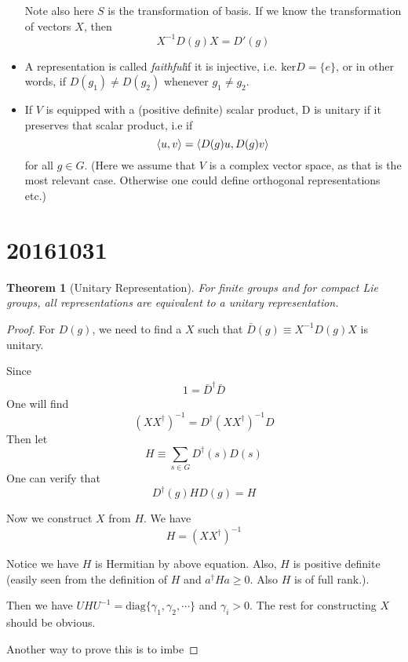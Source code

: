 \documentclass{article}
\numberwithin{equation}{subsection} %
\newtheorem{thm}{Theorem}[section]
\theoremstyle{definition}
\begin{document}
\begin{itemize}
        Note also here $S$ is the transformation of basis. If we know
        the transformation of vectors $X$, then
        \begin{equation}
            X^{-1} D(g)X = D'(g)
        \end{equation}
    \item A representation is called
        \textit{faithful}if it is injective, i.e.
        $\mathrm{ker} D = \{e\}$, or in other words, if $D(g_1) \neq
        D(g_2)$ whenever $g_1 \neq g_2$.
    \item If $V$ is equipped with a (positive definite) scalar
        product, D is unitary if it preserves that scalar product, i.e
        if
        \begin{equation}
            \braket{u,v} = \braket{D(g)u,D(g)v}
        \end{equation}
        for all $g\in G$. (Here we assume that $V$ is a complex vector
        space, as that is the most relevant case. Otherwise one could
        define orthogonal representations etc.)
\end{itemize}

\section{20161031}
\label{sec:20161031}

\begin{thm}[Unitary Representation]
    For finite groups and for compact Lie groups, all representations
    are equivalent to a unitary representation.
\end{thm}
\begin{proof}
    For $D(g)$, we need to find a $X$ such that $\bar{D}(g)\equiv
    X^{-1}D(g)X$ is unitary.

    Since
    \begin{align*}
        1 = \bar{D}^\dagger \bar{D}
    \end{align*}
    One will find 
    $$ (XX^\dagger)^{-1} = D^\dagger (XX^\dagger)^{-1} D$$
    Then let
    \begin{equation}
        H\equiv \sum_{s\in G} D^\dagger(s) D(s)
    \end{equation}
    One can verify that
    \begin{equation}
        D^\dagger (g) H D(g) = H
    \end{equation}

    Now we construct $X$ from $H$. We have
    \begin{equation}
        H = (XX^\dagger)^{-1}
    \end{equation}

    Notice we have $H$ is Hermitian by above equation. Also, $H$ is
    positive definite (easily seen from the definition of $H$ and 
    $a^\dagger H a \geq 0$. Also $H$ is of full rank.).

    Then we have $UHU^{-1} = \mathrm{diag}\{\gamma_1,\gamma_2,\cdots\}$
    and $\gamma_i > 0$. The rest for constructing $X$ should be
    obvious.

    Another way to prove this is to imbe
\end{proof}
\end{document}
